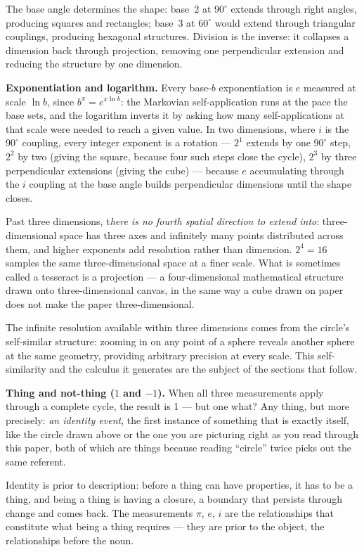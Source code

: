 \documentclass[12pt]{article}
\begin{document}
The base angle determines the shape: base~2 at $90^\circ$ extends through right angles, producing squares and rectangles; base~3 at $60^\circ$ would extend through triangular couplings, producing hexagonal structures. Division is the inverse: it collapses a dimension back through projection, removing one perpendicular extension and reducing the structure by one dimension.

\textbf{Exponentiation and logarithm.} Every base-$b$ exponentiation is $e$ measured at scale $\ln b$, since $b^x = e^{x \ln b}$: the Markovian self-application runs at the pace the base sets, and the logarithm inverts it by asking how many self-applications at that scale were needed to reach a given value. In two dimensions, where $i$ is the $90^\circ$ coupling, every integer exponent is a rotation --- $2^1$ extends by one $90^\circ$ step, $2^2$ by two (giving the square, because four such steps close the cycle), $2^3$ by three perpendicular extensions (giving the cube) --- because $e$ accumulating through the $i$ coupling at the base angle builds perpendicular dimensions until the shape closes.

Past three dimensions, t\textit{here is no fourth spatial direction to extend into}: three-dimensional space has three axes and infinitely many points distributed across them, and higher exponents add resolution rather than dimension. $2^4 = 16$ samples the same three-dimensional space at a finer scale. What is sometimes called a tesseract is a projection --- a four-dimensional mathematical structure drawn onto three-dimensional canvas, in the same way a cube drawn on paper does not make the paper three-dimensional. 

The infinite resolution available within three dimensions comes from the circle's self-similar structure: zooming in on any point of a sphere reveals another sphere at the same geometry, providing arbitrary precision at every scale. This self-similarity and the calculus it generates are the subject of the sections that follow.

\textbf{Thing and not-thing ($1$ and $-1$).} When all three measurements apply through a complete cycle, the result is 1 ---  but one what? Any thing, but more precisely: \textit{an identity event}, the first instance of something that is exactly itself, like the circle drawn above or the one you are picturing right as you read through this paper, both of which are things because reading ``circle'' twice picks out the same referent. 

Identity is prior to description: before a thing can have properties, it has to be a thing, and being a thing is having a closure, a boundary that persists through change and comes back. The measurements $\pi$, $e$, $i$ are the relationships that constitute what being a thing requires --- they are prior to the object, the relationships before the noun.
\end{document}
